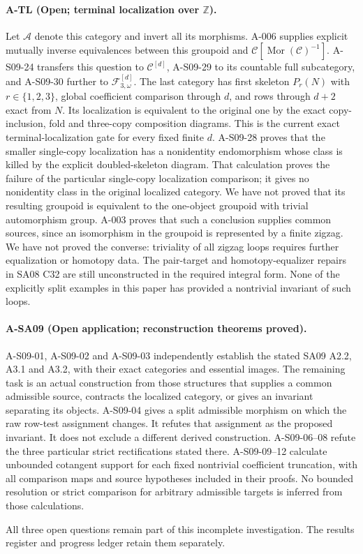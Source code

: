 \paragraph{A-TL (Open; terminal localization over $\mathbb Z$).}
Let $\mathcal A$ denote this category and invert all its morphisms.
A-006 supplies explicit mutually inverse equivalences between
this groupoid and $\mathcal C[\operatorname{Mor}(\mathcal C)^{-1}]$.
A-S09-24 transfers this question to $\mathcal C^{[d]}$,
A-S09-29 to its countable full subcategory, and A-S09-30 further
to $\mathcal F_{3,\omega}^{[d]}$.
The last category has first skeleton $P_r(N)$ with
$r\in\{1,2,3\}$, global coefficient comparison through $d$,
and rows through $d+2$ exact from $N$. Its localization is
equivalent to the original one by the exact copy-inclusion,
fold and three-copy composition diagrams. This is the current
exact terminal-localization gate for every fixed finite $d$.
A-S09-28 proves that the smaller single-copy localization has
a nonidentity endomorphism whose class is killed by the
explicit doubled-skeleton diagram. That calculation proves
the failure of the particular single-copy localization
comparison; it gives no nonidentity class in the original
localized category.
We have not proved that its resulting groupoid is equivalent to the
one-object groupoid with trivial automorphism group.  A-003 proves
that such a conclusion supplies common sources, since an isomorphism
in the groupoid is represented by a finite zigzag.  We have not
proved the converse: triviality of all zigzag loops requires further
equalization or homotopy data.  The pair-target and homotopy-equalizer
repairs in SA08 C32 are still unconstructed in the required integral
form.  None of the explicitly split examples in this paper has
provided a nontrivial invariant of such loops.

\paragraph{A-SA09 (Open application; reconstruction theorems proved).}
A-S09-01, A-S09-02 and A-S09-03 independently establish the stated
SA09 A2.2, A3.1 and A3.2, with their exact categories and essential
images.  The remaining task is an actual construction from those
structures that supplies a common admissible source, contracts the
localized category, or gives an invariant separating its objects.
A-S09-04 gives a split admissible morphism on which the raw row-test
assignment changes.  It refutes that assignment as the proposed
invariant.  It does not exclude a different derived construction.
A-S09-06--08 refute the three particular strict rectifications
stated there.  A-S09-09--12 calculate unbounded cotangent support
for each fixed nontrivial coefficient truncation, with all comparison
maps and source hypotheses included in their proofs.  No bounded
resolution or strict comparison for arbitrary admissible targets is
inferred from those calculations.

All three open questions remain part of this incomplete investigation.
The results register and progress ledger retain them separately.
